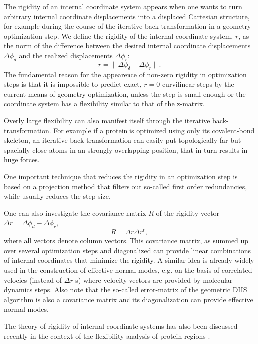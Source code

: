 \documentclass[prl,aps,preprint,superbib,12pt]{revtex4}
\begin{document}
The rigidity of an internal coordinate system appears when
one wants to turn arbitrary internal coordinate displacements
into a displaced Cartesian structure, for example
during the course of the iterative back-transformation 
\cite{PPulay77} in a geometry optimization step. 
We define the rigidity of the internal coordinate system, $r$, 
as the norm of the difference between the desired internal coordinate 
displacements $\Delta \phi_{d}$ 
and the realized displacements $\Delta \phi_{r}$: 
\begin{equation}
r = \| \Delta \phi_{d} - \Delta \phi_{r} \| .
\end{equation}
The fundamental reason for the appearence of non-zero
rigidity in optimization steps is 
that it is impossible to predict exact, $r=0$ curvilinear
steps by the current means of geometry optimization, unless
the step is small enough or the coordinate system has a flexibility 
similar to that of the z-matrix.

Overly large flexibility can also manifest itself through the iterative
back-transformation. For example if a protein is optimized
using only its covalent-bond skeleton, an iterative 
back-transformation can easily put
topologically far but spacially close atoms in an strongly 
overlapping position, that in turn results in huge forces.

One important technique 
that reduces the rigidity in an optimization step
is based on a projection method \cite{PPulay92} that filters out
so-called first order redundancies, while usually reduces 
the step-size.

One can also investigate the covariance matrix $R$
of the rigidity vector $\Delta r = \Delta \phi_{d} - \Delta \phi_{r}$,
\begin{equation}
R = \Delta r \Delta r^{t} ,
\end{equation}
where all vectors denote column vectors. This covariance matrix,
as summed up over several optimization steps and diagonalized 
can provide linear
combinations of internal coordinates that minimize the rigidity.
A similar idea \cite{MKarplus81,AStrachan04} 
is already widely used in the construction of 
effective normal modes, e.g. on the basis of correlated velocies
(instead of $\Delta r$-s) where velocity vectors
are provided by molecular dynamics steps. Also note that the so-called
error-matrix of the geometric DIIS algorithm \cite{PPulay84} is also a
covariance matrix and its diagonalization can provide effective
normal modes.

The theory of rigidity of internal coordinate systems has 
also been discussed recently in the context of the flexibility
analysis of protein regions \cite{AJRader02}.
\end{document}
